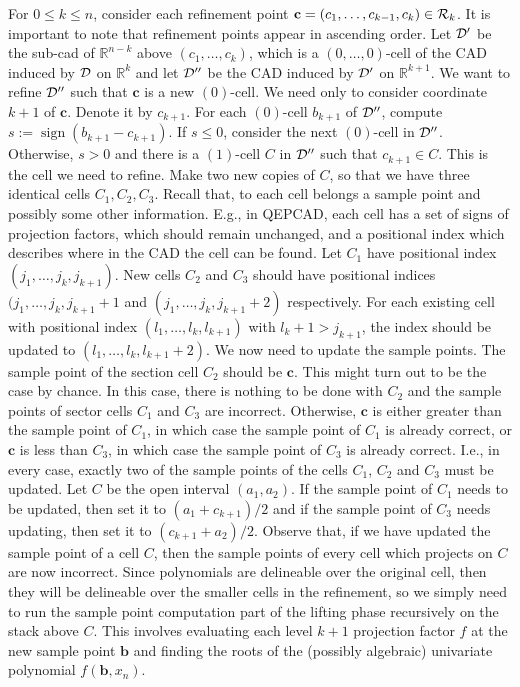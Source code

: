 \documentclass[
]{book}
\theoremstyle{definition}
\theoremstyle{definition}
\theoremstyle{definition}
\theoremstyle{definition}
\theoremstyle{remark}
\begin{document}
For \(0 \le k \le n\), consider each refinement point \(\mathbf{c} = (c_1,\ldots,c_{k-1}, c_k) \in {\cal R}_k\). It is important to note that refinement points appear in ascending order.
Let \({\cal D}'\) be the sub-cad of \(\mathbb{R}^{n-k}\) above \((c_1,\ldots,c_k)\), which is a \((0,\ldots,0)\)-cell of the CAD induced by \(\cal D\) on \(\mathbb{R}^k\) and let \({\cal D}''\) be the CAD induced by \({\cal D}'\) on \(\mathbb{R}^{k+1}\). We want to refine \({\cal D}''\) such that \(\mathbf{c}\) is a new \((0)\)-cell.
We need only to consider coordinate \(k+1\) of \(\mathbf{c}\). Denote it by \(c_{k+1}\).
For each \((0)\)-cell \(b_{k+1}\) of \({\cal D}''\), compute \(s := \operatorname{sign}(b_{k+1} - c_{k+1})\). If \(s \le 0\), consider the next \((0)\)-cell in \({\cal D}''\). Otherwise, \(s > 0\) and there is a \((1)\)-cell \(C\) in \({\cal D}''\) such that \(c_{k+1} \in C\). This is the cell we need to refine.
Make two new copies of \(C\), so that we have three identical cells \(C_1,C_2,C_3\). Recall that, to each cell belongs a sample point and possibly some other information. E.g., in QEPCAD, each cell has a set of signs of projection factors, which should remain unchanged, and a positional index which describes where in the CAD the cell can be found. Let \(C_1\) have positional index \((j_1,\ldots,j_k,j_{k+1})\). New cells \(C_2\) and \(C_3\) should have positional indices \((j_1,\ldots,j_k,j_{k+1} + 1\) and \((j_1,\ldots,j_k,j_{k+1}+2)\) respectively. For each existing cell with positional index \((l_1,\ldots,l_k,l_{k+1})\) with \(l_k+1 > j_{k+1}\), the index should be updated to \((l_1,\ldots,l_k,l_{k+1} + 2)\). We now need to update the sample points. The sample point of the section cell \(C_2\) should be \(\mathbf{c}\). This might turn out to be the case by chance. In this case, there is nothing to be done with \(C_2\) and the sample points of sector cells \(C_1\) and \(C_3\) are incorrect. Otherwise, \(\mathbf{c}\) is either greater than the sample point of \(C_1\), in which case the sample point of \(C_1\) is already correct, or \(\mathbf{c}\) is less than \(C_3\), in which case the sample point of \(C_3\) is already correct. I.e., in every case, exactly two of the sample points of the cells \(C_1\), \(C_2\) and \(C_3\) must be updated.
Let \(C\) be the open interval \((a_1,a_2)\). If the sample point of \(C_1\) needs to be updated, then set it to \((a_1 + c_{k+1}) / 2\) and if the sample point of \(C_3\) needs updating, then set it to \((c_{k+1} + a_2) / 2\). Observe that, if we have updated the sample point of a cell \(C\), then the sample points of every cell which projects on \(C\) are now incorrect.
Since polynomials are delineable over the original cell, then they will be delineable over the smaller cells in the refinement, so we simply need to run the sample point computation part of the lifting phase recursively on the stack above \(C\). This involves evaluating each level \(k+1\) projection factor \(f\) at the new sample point \(\mathbf{b}\) and finding the roots of the (possibly algebraic) univariate polynomial \(f(\mathbf{b},x_n)\).
\end{document}
